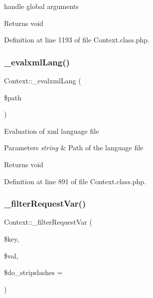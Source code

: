 handle global arguments

\begin{DoxyReturn}{Returns}
void 
\end{DoxyReturn}


Definition at line 1193 of file Context.\+class.\+php.

\mbox{\label{classContext_a45bd19b6edf9e66582842a3f6e50fa4b}} 
\subsubsection{\texorpdfstring{\+\_\+evalxml\+Lang()}{\_evalxmlLang()}}
{\footnotesize\ttfamily Context\+::\+\_\+evalxml\+Lang (\begin{DoxyParamCaption}\item[{}]{\$path }\end{DoxyParamCaption})}

Evaluation of xml language file


\begin{DoxyParams}{Parameters}
{\em string} & Path of the language file \\
\hline
\end{DoxyParams}
\begin{DoxyReturn}{Returns}
void 
\end{DoxyReturn}


Definition at line 891 of file Context.\+class.\+php.

\mbox{\label{classContext_a3c411bc0bf786b605af4a7af8ad3ee53}} 
\subsubsection{\texorpdfstring{\+\_\+filter\+Request\+Var()}{\_filterRequestVar()}}
{\footnotesize\ttfamily Context\+::\+\_\+filter\+Request\+Var (\begin{DoxyParamCaption}\item[{}]{\$key,  }\item[{}]{\$val,  }\item[{}]{\$do\+\_\+stripslashes = {} }\end{DoxyParamCaption})}

